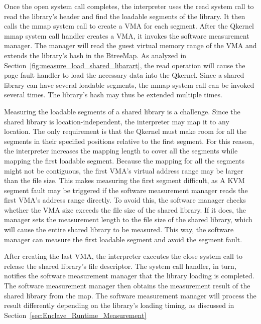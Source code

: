 Once the open system call completes, the interpreter uses the read system call to read the library's header and find the loadable segments of the library. It then calls the mmap system call to create a \acrshort{VMA} for each segment. After the Qkernel mmap system call handler creates a \acrshort{VMA}, 
it invokes the software measurement manager. The manager will read the guest virtual memory range of the \acrshort{VMA} and extends the library's hash in the BtreeMap. As analyzed in Section~\ref{fig:measure_load_shared_libarart}, the read operation will cause the page fault handler to load the necessary data 
into the Qkernel. Since a shared library can have several loadable segments, the mmap system call can be invoked several times. The library's hash may thus be extended multiple times.


Measuring the loadable segments of a shared library is a challenge. Since the shared library is location-independent, the interpreter may map it to any location. The only requirement is that the Qkernel must make room for all the segments in their specified positions relative to the first segment. 
For this reason, the interpreter increases the mapping length to cover all the segments while mapping the first loadable segment. Because the mapping for all the segments might not be contiguous, the first \acrshort{VMA}'s virtual address range may be larger than the file size. This makes measuring the first 
segment difficult, as A KVM segment fault may be triggered if the software measurement manager reads the first \acrshort{VMA}'s address range directly. To avoid this, the software manager checks whether the \acrshort{VMA} size exceeds the file size of the shared library. If it does, the manager sets the measurement length to the 
file size of the shared library, which will cause the entire shared library to be measured. This way, the software manager can measure the first loadable segment and avoid the segment fault.



After creating the last \acrshort{VMA}, the interpreter executes the close system call to release the shared library's file descriptor. The system call handler, in turn, notifies the software measurement manager that the library loading is completed. The software measurement manager then obtains the measurement 
result of the shared library from the map. The software measurement manager will process the result differently depending on the library's loading timing, as discussed in Section~\ref{sec:Enclave_Runtime_Measurement}
